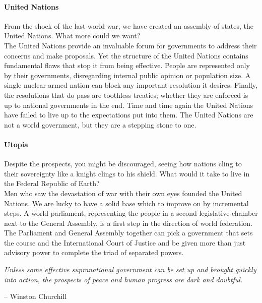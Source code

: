 \documentclass[11pt,a4paper]{article}
\begin{document}
\begin{multicols}{2}
\paragraph{United Nations}

From the shock of the last world war, we have created an assembly of states, the United Nations. What more could we want?\\
\noindent The United Nations provide an invaluable forum for governments to address their concerns and make proposals.
Yet the structure of the United Nations contains fundamental flaws that stop it from being effective.
People are represented only by their governments, disregarding internal public opinion or population size.
A single nuclear-armed nation can block any important resolution it desires.
Finally, the resolutions that do pass are toothless treaties; whether they are enforced is up to national governments in the end.
Time and time again the United Nations have failed to live up to the expectations put into them.
The United Nations are not a world government, but they are a stepping stone to one.


\paragraph{Utopia}

Despite the prospects, you might be discouraged, seeing how nations cling to their sovereignty like a knight clings to his shield. What would it take to live in the Federal Republic of Earth?\\
\noindent Men who saw the devastation of war with their own eyes founded the United Nations. We are lucky to have a solid base which to improve on by incremental steps.
A world parliament, representing the people in a second legislative chamber next to the General Assembly, is a first step in the direction of world federation.
The Parliament and General Assembly together can pick a government that sets the course and the International Court of Justice and be given more than just advisory power to complete the triad of separated powers.

\begin{shaded*}
\noindent \textit{Unless some effective supranational government can be set up and brought quickly into action, the prospects of peace and human progress are dark and doubtful.}
\begin{flushright}
-- Winston Churchill
\end{flushright}
\vspace{-12pt}
\end{shaded*}

\end{multicols}
\end{document}

